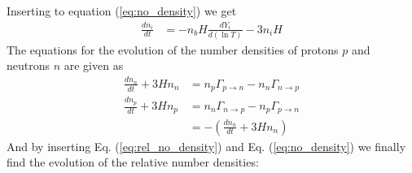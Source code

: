\documentclass[reprint,english,notitlepage]{revtex4-1}  %
\numberwithin{equation}{section}
\begin{document}
Inserting to equation (\ref{eq:no_density}) we get
\begin{align}
	\frac{d n_i}{dt} &= - n_b H \frac{dY_i}{d(\ln T)} - 3 n_i H
\end{align}
The equations for the evolution of the number densities of protons $p$ and
neutrons $n$ are given as
\begin{align}
	\frac{d n_n}{dt} + 3H n_n &= n_p \Gamma_{p\rightarrow n} - n_n\Gamma_{n\rightarrow p} \\
	\frac{d n_p}{dt} + 3H n_p &= n_n\Gamma_{n\rightarrow p} - n_p \Gamma_{p\rightarrow n}  \\
														&= - \left( \frac{d n_n}{dt} + 3H n_n \right)
\end{align}
And by inserting Eq. (\ref{eq:rel_no_density}) and Eq. (\ref{eq:no_density})
we finally find the evolution of the relative number densities:
\begin{align}

\end{align}
\end{document}
